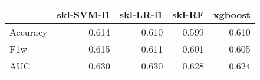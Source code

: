\begin{tabular}{lrrrr}
\toprule
{} &  skl-SVM-l1 &  skl-LR-l1 &  skl-RF &  xgboost \\
\midrule
Accuracy &       0.614 &      0.610 &   0.599 &    0.610 \\
F1w      &       0.615 &      0.611 &   0.601 &    0.605 \\
AUC      &       0.630 &      0.630 &   0.628 &    0.624 \\
\bottomrule
\end{tabular}
